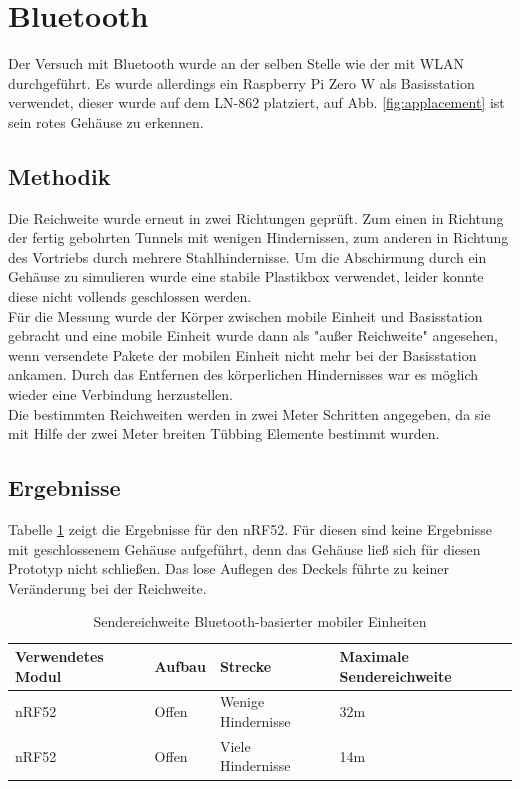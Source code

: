 \section{Bluetooth}
Der Versuch mit Bluetooth wurde an der selben Stelle wie der mit WLAN durchgeführt.
Es wurde allerdings ein Raspberry Pi Zero W als Basisstation verwendet, dieser wurde auf dem LN-862 platziert, auf Abb. \ref{fig:applacement} ist sein rotes Gehäuse zu erkennen.

\subsection{Methodik}
Die Reichweite wurde erneut in zwei Richtungen geprüft. 
Zum einen in Richtung der fertig gebohrten Tunnels mit wenigen Hindernissen, zum anderen in Richtung des Vortriebs durch mehrere Stahlhindernisse.
Um die Abschirmung durch ein Gehäuse zu simulieren wurde eine stabile Plastikbox verwendet, leider konnte diese nicht vollends geschlossen werden.\\
Für die Messung wurde der Körper zwischen mobile Einheit und Basisstation gebracht und eine mobile Einheit wurde dann als "außer Reichweite" angesehen, wenn versendete Pakete der mobilen Einheit nicht mehr bei der Basisstation ankamen.
Durch das Entfernen des körperlichen Hindernisses war es möglich wieder eine Verbindung herzustellen.\\
Die bestimmten Reichweiten werden in zwei Meter Schritten angegeben, da sie mit Hilfe der zwei Meter breiten Tübbing Elemente bestimmt wurden.

\subsection{Ergebnisse}
Tabelle \ref{table:rangeblue} zeigt die Ergebnisse für den nRF52.
Für diesen sind keine Ergebnisse mit geschlossenem Gehäuse aufgeführt, denn das Gehäuse ließ sich für diesen Prototyp nicht schließen.
Das lose Auflegen des Deckels führte zu keiner Veränderung bei der Reichweite.

\begin{table}[h]
	\centering
	\caption{Sendereichweite Bluetooth-basierter mobiler Einheiten}
	\label{table:rangeblue}
	\begin{tabular}{p{3.5cm}|p{3cm}|p{3.5cm}|p{3cm}}
		Verwendetes Modul & Aufbau & Strecke & Maximale Sendereichweite \\
		\hline
		nRF52 & Offen & Wenige Hindernisse & 32m \\
		nRF52 & Offen & Viele Hindernisse & 14m \\
	\end{tabular}
\end{table}

